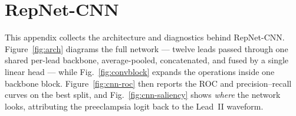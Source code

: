 \documentclass[sigconf,nonacm]{acmart}
\begin{document}




\appendix
\onecolumn

\clearpage
\section{RepNet-CNN}
\label{appendix:cnn}
\setlength{\intextsep}{3pt}
\setlength{\floatsep}{3pt}
\setlength{\textfloatsep}{3pt}

This appendix collects the architecture and diagnostics behind RepNet-CNN.
Figure~\ref{fig:arch} diagrams the full network --- twelve leads passed
through one shared per-lead backbone, average-pooled, concatenated, and fused
by a single linear head --- while Fig.~\ref{fig:convblock} expands the
operations inside one backbone block. Figure~\ref{fig:cnn-roc} then reports
the ROC and precision--recall curves on the best split, and
Fig.~\ref{fig:cnn-saliency} shows \emph{where} the network looks, attributing
the preeclampsia logit back to the Lead~II waveform.
\end{document}
